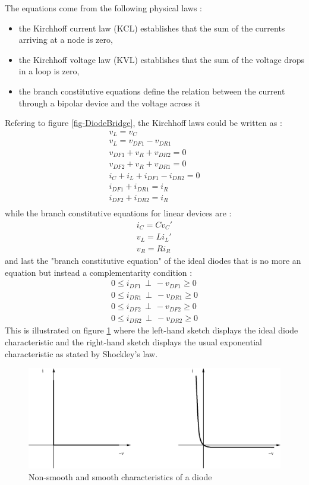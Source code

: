\documentclass[10pt]{article}
\begin{document}
The equations come from the following physical laws :
\begin{itemize}
\item the Kirchhoff current law (KCL) establishes that the sum of the currents arriving at a node is zero,
\item the Kirchhoff voltage law (KVL) establishes that the sum of the voltage drops in a loop is zero,
\item the branch constitutive equations define the relation between the current through a bipolar device
and the voltage across it
\end{itemize}
Refering to figure \ref{fig-DiodeBridge}, the Kirchhoff laws could be written as :
\[
\begin{array}{l}
v_L = v_C\\
v_L = v_{DF1} - v_{DR1}\\
v_{DF1} + v_R + v_{DR2} = 0\\
v_{DF2} + v_R + v_{DR1} = 0\\

i_C + i_L + i_{DF1} - i_{DR2} = 0\\
i_{DF1} + i_{DR1} = i_R\\
i_{DF2} + i_{DR2} = i_R\\
\end{array}
\]
while the branch constitutive equations for linear devices are :
\[
\begin{array}{l}
i_C = C v_C'\\
v_L = L i_L'\\
v_R = R i_R
\end{array}
\]
and last the "branch constitutive equation" of the ideal diodes that is no more an equation but instead
a complementarity condition :
\[ 
\begin{array}{l}
0 \leq i_{DF1} \, \perp \, -v_{DF1} \geq 0\\
0 \leq i_{DR1} \, \perp \, -v_{DR1} \geq 0\\
0 \leq i_{DF2} \, \perp \, -v_{DF2} \geq 0\\
0 \leq i_{DR2} \, \perp \, -v_{DR2} \geq 0
\end{array}
\]
This is illustrated on figure \ref{fig-diode-reg} where the left-hand sketch displays the ideal diode 
characteristic and the right-hand sketch displays the usual exponential characteristic as stated by
Shockley's law.

\begin{figure}[htp]
\begin{center}
\includegraphics[width=12cm]{diode-caract.eps}
\end{center}
\caption{Non-smooth and smooth characteristics of a diode}
\label{fig-diode-reg}
\end{figure}
\end{document}
